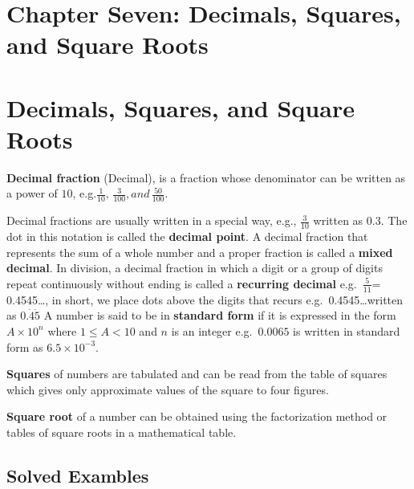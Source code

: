 \documentclass[
  letterpaper,
  DIV=11,
  numbers=noendperiod]{scrreprt}
\begin{document}
\hypertarget{chapter-seven-decimals-squares-and-square-roots}{%
\chapter{Chapter Seven: Decimals, Squares, and Square
Roots}\label{chapter-seven-decimals-squares-and-square-roots}}


\hypertarget{decimals-squares-and-square-roots}{%
\chapter*{Decimals, Squares, and Square
Roots}\label{decimals-squares-and-square-roots}}


\textbf{Decimal fraction} (Decimal), is a fraction whose denominator can
be written as a power of \(10\),
e.g.\(\frac{1}{10},\,\frac{3}{100}, and\,\frac{50}{100}\).

Decimal fractions are usually written in a special way, e.g.,
\(\frac{3}{10}\) written as \(0.3\). The dot in this notation is called
the \textbf{decimal point}. A decimal fraction that represents the sum
of a whole number and a proper fraction is called a \textbf{mixed
decimal}. In division, a decimal fraction in which a digit or a group of
digits repeat continuously without ending is called a \textbf{recurring
decimal} e.g.~\(\frac{5}{11}\)= 0.4545\ldots, in short, we place dots
above the digits that recurs e.g.~0.4545\ldots written as
\(0.\dot{4}\dot{5}\) A number is said to be in \textbf{standard form} if
it is expressed in the form \(A\times 10^n\) where \(1\leq A<10\) and
\(n\) is an integer e.g.~\(0.0065\) is written in standard form as
\(6.5\times 10^{-3}\).

\textbf{Squares} of numbers are tabulated and can be read from the table
of squares which gives only approximate values of the square to four
figures.

\textbf{Square root} of a number can be obtained using the factorization
method or tables of square roots in a mathematical table.

\hypertarget{solved-exambles}{%
\section{Solved Exambles}\label{solved-exambles}}
\end{document}
